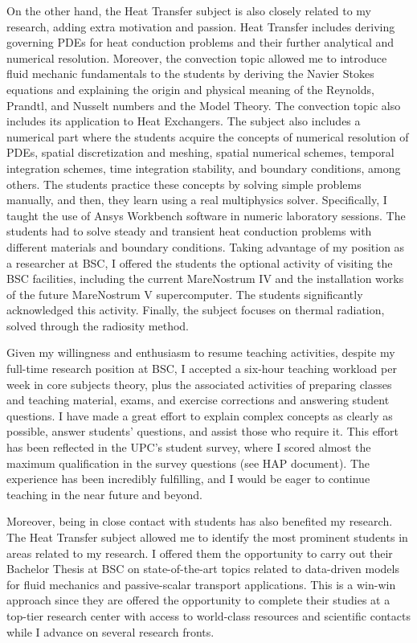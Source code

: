 \documentclass{article}
\begin{document}
On the other hand, the Heat Transfer subject is also closely related to my research, adding extra motivation and passion. Heat Transfer includes deriving governing PDEs for heat conduction problems and their further analytical and numerical resolution. Moreover, the convection topic allowed me to introduce fluid mechanic fundamentals to the students by deriving the Navier Stokes equations and explaining the origin and physical meaning of the Reynolds, Prandtl, and Nusselt numbers and the Model Theory. The convection topic also includes its application to Heat Exchangers. The subject also includes a numerical part where the students acquire the concepts of numerical resolution of PDEs, spatial discretization and meshing, spatial numerical schemes, temporal integration schemes, time integration stability, and boundary conditions, among others. The students practice these concepts by solving simple problems manually, and then, they learn using a real multiphysics solver. Specifically, I taught the use of Ansys Workbench software in numeric laboratory sessions. The students had to solve steady and transient heat conduction problems with different materials and boundary conditions. Taking advantage of my position as a researcher at BSC, I offered the students the optional activity of visiting the BSC facilities, including the current MareNostrum IV and the installation works of the future MareNostrum V supercomputer. The students significantly acknowledged this activity. Finally, the subject focuses on thermal radiation, solved through the radiosity method.

Given my willingness and enthusiasm to resume teaching activities, despite my full-time research position at BSC, I accepted a six-hour teaching workload per week in core subjects theory, plus the associated activities of preparing classes and teaching material, exams, and exercise corrections and answering student questions. I have made a great effort to explain complex concepts as clearly as possible, answer students' questions, and assist those who require it. This effort has been reflected in the UPC's student survey, where I scored almost the maximum qualification in the survey questions (see HAP document). The experience has been incredibly fulfilling, and I would be eager to continue teaching in the near future and beyond. 

Moreover, being in close contact with students has also benefited my research. The Heat Transfer subject allowed me to identify the most prominent students in areas related to my research. I offered them the opportunity to carry out their Bachelor Thesis at BSC on state-of-the-art topics related to data-driven models for fluid mechanics and passive-scalar transport applications. This is a win-win approach since they are offered the opportunity to complete their studies at a top-tier research center with access to world-class resources and scientific contacts while I advance on several research fronts. 
\end{document}

